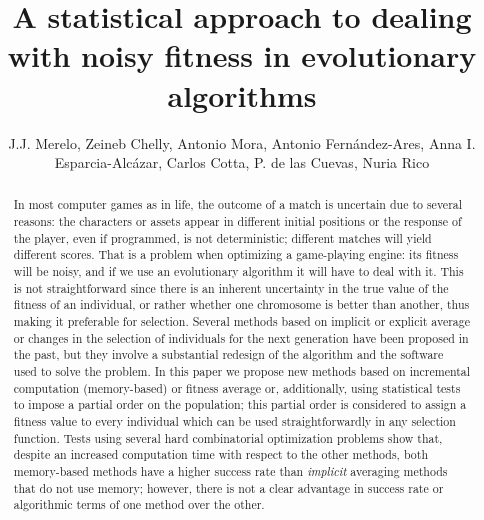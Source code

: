\documentclass{svmult}
\begin{document}
\title{A statistical approach to dealing with noisy fitness in evolutionary algorithms}

\author{J.J. Merelo, Zeineb Chelly, Antonio
  Mora, Antonio Fern\'andez-Ares, Anna
  I. Esparcia-Alc\'azar, Carlos Cotta, P. de las Cuevas, Nuria
  Rico}

\maketitle

\begin{abstract}
In most computer games as in life, the outcome of a match is uncertain due
  to several reasons: the characters or assets appear in different initial
  positions or the response of the player, even if programmed, is not
  deterministic; different matches will yield different scores. That is a
  problem when optimizing a game-playing engine: its fitness will be
  noisy, and if we use an evolutionary algorithm it will have to deal
  with it. This is not straightforward since there is an inherent
uncertainty in the true value of the fitness of an individual, or
rather whether one chromosome is better than another, thus making it preferable for selection.
Several methods based on implicit or explicit average or
changes in the selection of individuals for the next generation have been proposed in the past, 
but they involve a substantial redesign of the algorithm and the
software used to solve the problem. In this paper we propose  new
methods based on incremental computation (memory-based) or fitness average or, additionally, using
statistical tests to impose a partial order on the population; this
partial order is considered to assign a fitness value to every individual
which can be used straightforwardly in any selection function. 
Tests using several
hard combinatorial optimization problems show that, despite
an increased computation time with respect to the other methods, both memory-based methods have a higher
success rate than {\em implicit} averaging methods that do not use
memory; however, there is not a clear advantage in success rate or
algorithmic terms of one method over the other. 

\end{abstract}
\end{document}
